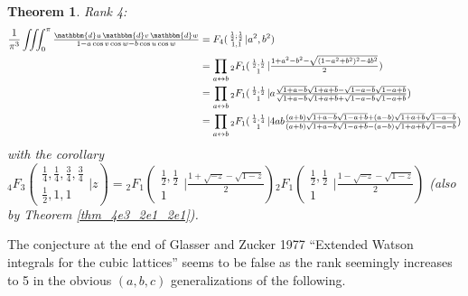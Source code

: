 \documentclass[12pt]{article}
\newcommand{\dd}[0] {\mathbbm{d}}
\numberwithin{equation}{section}
\newtheorem{theorem}{Theorem}[section]
\newcommand{\Head}[3] {{}_{#1}{#2}_{#3}}
\newcommand{\ArgS}[3] {( \begin{smallmatrix} #1 \\ #2 \end{smallmatrix} | {#3})}
\newcommand{\ArgKS}[1] {\ArgS{\frac12,\frac12}{1}{#1}}
\newcommand{\appellFfourS}[6]    {F_4 \ArgS{{#1};{#2}}{{#3},{#4}}{{#5},{#6}}}
\newcommand{\FFs}[6] {{}_{#1}{#2}_{#3} ( \begin{smallmatrix} #4 \\ #5 \end{smallmatrix} | {#6}  )}
\begin{document}
\begin{theorem} Rank 4:
\begin{align*}
\frac{1}{\pi^3} \iiint_0^{\pi} \tfrac{\dd u \, \dd v \, \dd w} {1 - a \cos v \cos w - b \cos u \cos w} &= \appellFfourS{\frac12}{\frac12}{1}{1}{a^2}{b^2}\\
 &= \prod_{a \leftrightarrow b} \Head{2}{F}{1} \ArgKS{\tfrac{1 + a^2 - b^2-\sqrt{(1-a^2+b^2)^2-4b^2}}{2}}\\
&= \prod_{a \leftrightarrow b} \Head{2}{F}{1} \ArgKS{a\tfrac{\sqrt{1+a-b}\sqrt{1+a+b}-\sqrt{1-a-b}\sqrt{1-a+b}}{\sqrt{1+a-b}\sqrt{1+a+b}+\sqrt{1-a-b}\sqrt{1-a+b}}}\\
&= \prod_{a \leftrightarrow b} \Head{2}{F}{1}\ArgS{\frac14,\frac14}{1}{4a b \tfrac{(a+b)\sqrt{1+a-b}\sqrt{1-a+b} + (a-b) \sqrt{1+a+b}\sqrt{1-a-b}}{(a+b)\sqrt{1+a-b}\sqrt{1-a+b} - (a-b) \sqrt{1+a+b}\sqrt{1-a-b}}}
\end{align*}
with the corollary
$\FFs{4}{F}{3}{\frac14,\frac14,\frac34,\frac34}{\frac12,1,1}{z} = \Head{2}{F}{1}\ArgKS{\tfrac{1+\sqrt{-z} -\sqrt{1-z}}{2}} \Head{2}{F}{1}\ArgKS{\tfrac{1-\sqrt{-z} -\sqrt{1-z}}{2}}$ (also by Theorem \ref{thm_4e3_2e1_2e1}).
\end{theorem}

The conjecture at the end of Glasser and Zucker 1977 ``Extended Watson integrals for the cubic lattices'' seems to be false as the rank seemingly increases to 5 in the obvious $(a,b,c)$ generalizations of the following.
\end{document}
